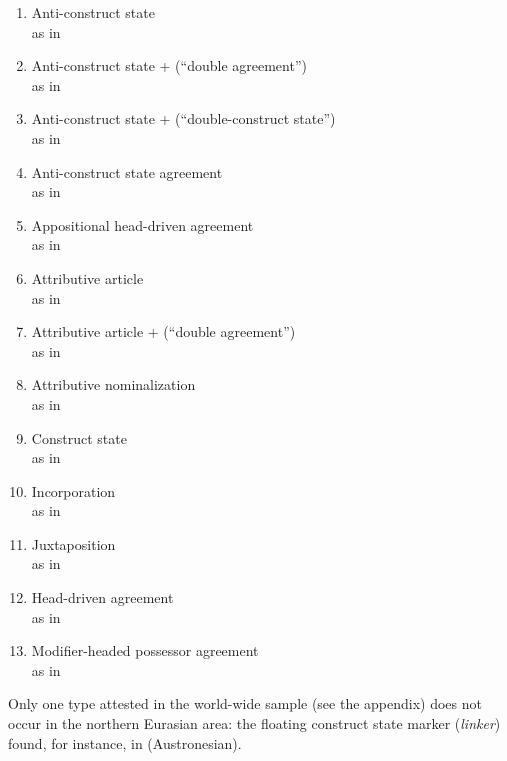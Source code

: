 \begin{enumerate}
\item Anti\hyp{}construct state\\as in 
\item Anti\hyp{}construct state +  (“double agreement”)\\as in 
\item Anti\hyp{}construct state +  (“double\hyp{}construct state”)\\as in 
\item Anti\hyp{}construct state agreement\\as in 
\item Appositional head\hyp{}driven agreement\\as in 
\item Attributive article\\as in 
\item Attributive article +  (“double agreement”)\\as in 
\item Attributive nominalization\\as in 
\item Construct state\\as in 
\item Incorporation\\as in 
\item Juxtaposition\\as in 
\item Head\hyp{}driven agreement\\as in 
\item Modifier\hyp{}headed possessor agreement\\as in 
\end{enumerate}
Only one type attested in the world-wide sample (see the appendix) does not occur in the northern Eurasian area: the floating construct state marker (\textit{linker}) found, for instance, in  (Austronesian). 

